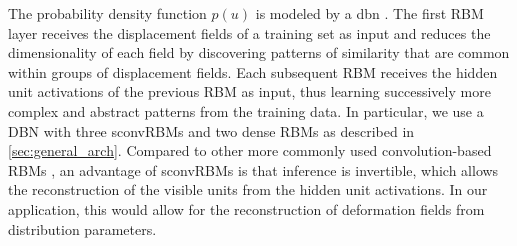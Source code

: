 The probability density function $p(u)$ is modeled by a \gls{dbn}
\citep{hinton2006b}. The first RBM layer receives the displacement fields of a
training set as input and reduces the dimensionality of each field by
discovering patterns of similarity that are common within groups of displacement
fields. Each subsequent RBM receives the hidden unit activations of the previous
RBM as input, thus learning successively more complex and abstract patterns from
the training data. In particular, we use a DBN with three sconvRBMs and two
dense RBMs as described in \ref{sec:general_arch}. Compared to other more
commonly used convolution-based RBMs \citep{lee2009}, an advantage of sconvRBMs
is that inference is invertible, which allows the reconstruction of the visible
units from the hidden unit activations. In our application, this would allow for
the reconstruction of deformation fields from distribution parameters.

